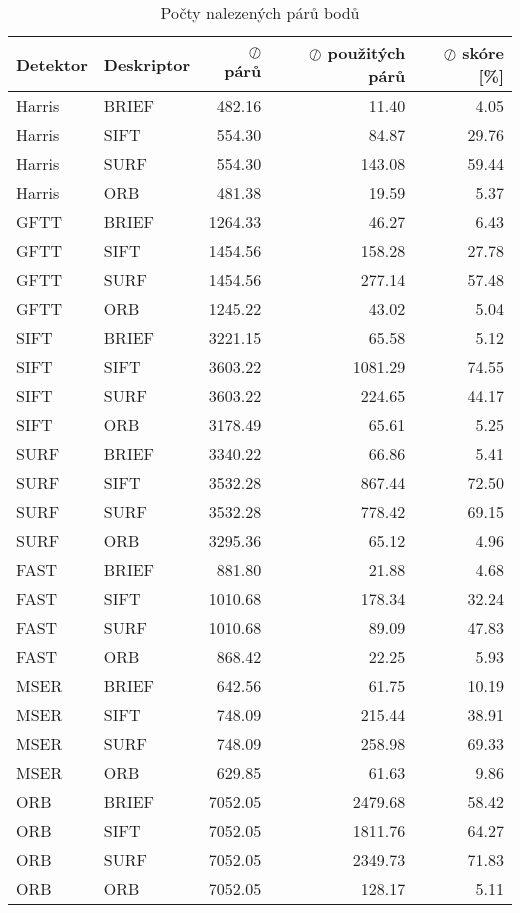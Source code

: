 \begin{table}[!ht]\centering
\begin{tabular}{ l l| r r r }
	Detektor & Deskriptor & $\oslash$ párů & $\oslash$ použitých párů & $\oslash$ skóre [\%] \\
	\hline
	 Harris &  BRIEF & 482.16 & 11.40 & 4.05 \\
	 Harris &  SIFT & 554.30 & 84.87 & 29.76 \\
	 Harris &  SURF & 554.30 & 143.08 & 59.44 \\
	 Harris &  ORB & 481.38 & 19.59 & 5.37 \\
	 GFTT &  BRIEF & 1264.33 & 46.27 & 6.43 \\
	 GFTT &  SIFT & 1454.56 & 158.28 & 27.78 \\
	 GFTT &  SURF & 1454.56 & 277.14 & 57.48 \\
	 GFTT &  ORB & 1245.22 & 43.02 & 5.04 \\
	 SIFT &  BRIEF & 3221.15 & 65.58 & 5.12 \\
	 SIFT &  SIFT & 3603.22 & 1081.29 & 74.55 \\
	 SIFT &  SURF & 3603.22 & 224.65 & 44.17 \\
	 SIFT &  ORB & 3178.49 & 65.61 & 5.25 \\
	 SURF &  BRIEF & 3340.22 & 66.86 & 5.41 \\
	 SURF &  SIFT & 3532.28 & 867.44 & 72.50 \\
	 SURF &  SURF & 3532.28 & 778.42 & 69.15 \\
	 SURF &  ORB & 3295.36 & 65.12 & 4.96 \\
	 FAST &  BRIEF & 881.80 & 21.88 & 4.68 \\
	 FAST &  SIFT & 1010.68 & 178.34 & 32.24 \\
	 FAST &  SURF & 1010.68 & 89.09 & 47.83 \\
	 FAST &  ORB & 868.42 & 22.25 & 5.93 \\
	 MSER &  BRIEF & 642.56 & 61.75 & 10.19 \\
	 MSER &  SIFT & 748.09 & 215.44 & 38.91 \\
	 MSER &  SURF & 748.09 & 258.98 & 69.33 \\
	 MSER &  ORB & 629.85 & 61.63 & 9.86 \\
	 ORB &  BRIEF & 7052.05 & 2479.68 & 58.42 \\
	 ORB &  SIFT & 7052.05 & 1811.76 & 64.27 \\
	 ORB &  SURF & 7052.05 & 2349.73 & 71.83 \\
	 ORB &  ORB & 7052.05 & 128.17 & 5.11
\end{tabular}
	\caption[Short Heading]{\protect Počty nalezených párů bodů}\label{tab_matchcount}
\end{table}